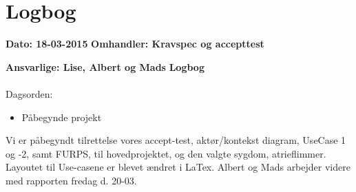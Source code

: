 \chapter{Logbog}

\textbf{Dato: 18-03-2015} 
\textbf{Omhandler: Kravspec og accepttest} 

\textbf{Ansvarlige: Lise, Albert og Mads} 
\textbf{Logbog}
\\
\\
Dagsorden:
\begin{itemize}
	\item Påbegynde projekt
\end{itemize}

Vi er påbegyndt tilrettelse vores accept-test, aktør/kontekst diagram, UseCase 1 og -2, samt FURPS, til hovedprojektet, og den valgte sygdom, atrieflimmer. Layoutet til Use-casene er blevet ændret i LaTex. Albert og Mads arbejder videre med rapporten fredag d. 20-03.